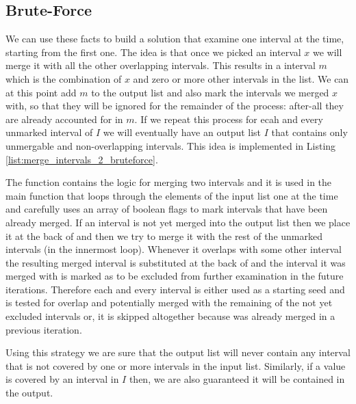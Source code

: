 \subsection{Brute-Force}
\label{example:merge_intervals_2:bruteforce_1}
We can use these facts to build a solution that examine one interval at the time, starting from the first one. The idea is that once we picked an interval $x$ we will merge it with all the other overlapping intervals. This results in a interval $m$ which is the combination of $x$ and zero or more other intervals in the list. We can at this point add $m$ to the output list and also mark the intervals we merged $x$ with, so that they will be ignored for the remainder of the process: after-all they are already accounted for in $m$. 
If we repeat this process for ecah and every unmarked interval of $I$ we will eventually have an output list $I$ that contains only unmergable and non-overlapping intervals. 
This idea is implemented in Listing \ref{list:merge_intervals_2_bruteforce}. 



The function  contains the logic for merging two intervals and it is used in the main function  that loops through the elements of the input list one at the time and carefully uses an array of boolean flags  to mark intervals that have been already merged.
If an interval is not yet merged into the output list  then we place it at the back of  and then we try to merge it with the rest of the unmarked intervals (in the innermost loop).
Whenever it overlaps with some other interval the resulting merged interval is substituted at the back of  and the interval it was merged with is marked as to be excluded from further examination in the future iterations.
Therefore each and every interval is either used as a starting seed and is tested for overlap and potentially merged with the remaining of the not yet excluded intervals or, it is skipped altogether because was already merged in a previous iteration.

Using this strategy we are sure that the output list will never contain any interval that is not covered by one or more intervals in the input list. Similarly, if a value is covered by an interval in $I$ then, we are also guaranteed it will be contained in the output.

